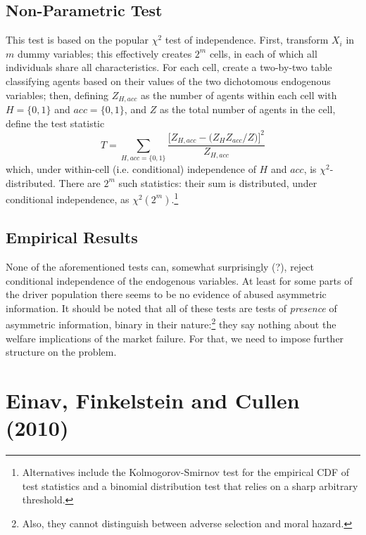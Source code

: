 \documentclass[11pt]{article}
\numberwithin{equation}{section}
\begin{document}
\subsection{Non-Parametric Test}

This test is based on the popular $\chi^2$ test of independence. First, transform $X_i$ in $m$ dummy variables; this effectively creates $2^m$ cells, in each of which all individuals share all characteristics. For each cell, create a two-by-two table classifying agents based on their values of the two dichotomous endogenous variables; then, defining $Z_{H,acc}$ as the number of agents within each cell with $H = \{0,1\}$ and $acc = \{0,1\}$, and $Z$ as the total number of agents in the cell, define the test statistic
\begin{equation}
  T = \sum_{H, acc = \{0,1\}} \frac{\big[Z_{H, acc} - \big(Z_H Z_{acc} / Z\big) \big]^2}{Z_{H, acc}}
\end{equation}
which, under within-cell (i.e. conditional) independence of $H$ and $acc$, is $\chi^2$-distributed. There are $2^m$ such statistics: their sum is distributed, under conditional independence, as $\chi^2 (2^m)$.\footnote{Alternatives include the Kolmogorov-Smirnov test for the empirical CDF of test statistics and a binomial distribution test that relies on a sharp arbitrary threshold.}

\subsection{Empirical Results}
None of the aforementioned tests can, somewhat surprisingly (?), reject conditional independence of the endogenous variables. At least for some parts of the driver population there seems to be no evidence of abused asymmetric information. It should be noted that all of these tests are tests of \textit{presence} of asymmetric information, binary in their nature:\footnote{Also, they cannot distinguish between adverse selection and moral hazard.} they say nothing about the welfare implications of the market failure. For that, we need to impose further structure on the problem.

\section{Einav, Finkelstein and Cullen (2010)}
\end{document}
